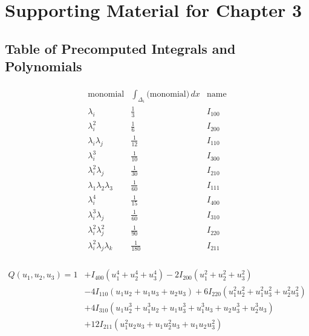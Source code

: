 \chapter{Supporting Material for Chapter 3}

\section{Table of Precomputed Integrals and Polynomials} \label{appendix-3:int-table}

\renewcommand{\arraystretch}{1.2} %
\begin{align}
\begin{array}{c|c|c}
\text{monomial} & \int_{\Delta_i}\text{(monomial)}\,dx & \text{name} \\ \hline
\lambda_i & \tfrac{1}{3}  & I_{100} \\
\lambda_i^2 & \tfrac{1}{6} & I_{200} \\
\lambda_i\lambda_j & \tfrac{1}{12} & I_{110} \\
\lambda_i^3 & \tfrac{1}{10} & I_{300} \\
\lambda_i^2\lambda_j & \tfrac{1}{30} & I_{210} \\
\lambda_1\lambda_2\lambda_3 & \tfrac{1}{60} & I_{111} \\
\lambda_i^4 & \tfrac{1}{15} & I_{400} \\
\lambda_i^3\lambda_j & \tfrac{1}{60} & I_{310} \\
\lambda_i^2\lambda_j^2 & \tfrac{1}{90} & I_{220} \\
\lambda_i^2\lambda_j\lambda_k & \tfrac{1}{180} & I_{211} \\
\end{array}
\end{align}

\begin{align}\label{eq-Q}
Q(u_1, u_2, u_3) 
= 1 & + I_{400}(u_1^4+u_2^4+u_3^4) -  2I_{200}(u_1^2+u_2^2+u_3^2)  \nonumber \\
& -4I_{110}(u_1u_2 + u_1u_3+u_2u_3) + 6I_{220}(u_1^2u_2^2 + u_1^2u_3^2+u_2^2u_3^2) \nonumber \\
& +4I_{310}(u_1u_2^3 + u_1^3u_2 + u_1u_3^3+ u_1^3u_3 + u_2u_3^3 + u_2^3u_3) \nonumber \\
& +12I_{211}(u_1^2u_2u_3 + u_1u_2^2u_3 + u_1u_2u_3^2)
\end{align}



